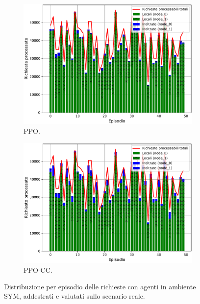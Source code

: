 \begin{figure}
    \centering

    \begin{subfigure}{.9\textwidth}
        \centering
        \includegraphics[width=\linewidth]{assets/5/results/real_real_ppo_proc_reqs_abs.pdf}
        \caption{PPO.}
    \end{subfigure}
    
    \begin{subfigure}{.9\textwidth}
        \centering
        \includegraphics[width=\linewidth]{assets/5/results/real_real_ppo_cc_proc_reqs_abs.pdf}
        \caption{PPO-CC.}
    \end{subfigure}
    
    \caption[Distribuzione per episodio delle richieste in valore assoluti]{Distribuzione per episodio delle richieste con agenti in ambiente SYM, addestrati e valutati sullo scenario reale.}
    \label{fig:5_sym_real_ppo_vs_ppo_cc}
\end{figure}

